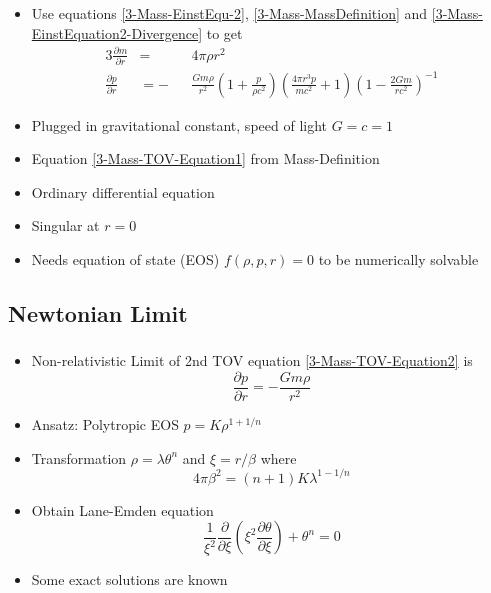 \begin{frame}
	\begin{itemize}[<+->]
		\item Use equations \ref{3-Mass-EinstEqu-2}, \ref{3-Mass-MassDefinition} and \ref{3-Mass-EinstEquation2-Divergence} to get
		\begin{alignat}{3}
			\frac{\partial m}{\partial r} &= &&4\pi\rho r^2\label{3-Mass-TOV-Equation1}\\
			\frac{\partial p}{\partial r} &= -&&\frac{Gm\rho}{r^2}\left(1+\frac{p}{\rho c^2}\right)\left(\frac{4\pi r^3p}{mc^2}+1\right)\left(1-\frac{2Gm}{rc^2}\right)^{-1}\label{3-Mass-TOV-Equation2}
		\end{alignat}
		\item Plugged in gravitational constant, speed of light $G=c=1$
		\item Equation \ref{3-Mass-TOV-Equation1} from Mass-Definition
		\item Ordinary differential equation
		\item Singular at $r=0$
		\item Needs equation of state (EOS) $f(\rho,p,r)=0$ to be numerically solvable
	\end{itemize}
\end{frame}

\subsection{Newtonian Limit}
\begin{frame}
	\frametitle{\insertsubsection}
	\begin{itemize}[<+->]
		\item Non-relativistic Limit of 2nd TOV equation \ref{3-Mass-TOV-Equation2} is
		\begin{equation}\frac{
			\partial p}{\partial r}=-\frac{Gm\rho}{r^2}
		\end{equation}
		\item Ansatz: Polytropic EOS $p=K\rho^{1+1/n}$
		\item Transformation $\rho=\lambda\theta^n$ and $\xi=r/\beta$ where
		\begin{equation}
			4\pi\beta^2=(n+1)K\lambda^{1-1/n}
		\end{equation}
		\item Obtain Lane-Emden equation \cite{laneTheoreticalTemperatureSun1870} \cite{emdenGaskugeln1907}
		\begin{equation}
			\frac{1}{\xi^2}\frac{\partial}{\partial\xi}\left(\xi^2\frac{\partial\theta}{\partial\xi}\right)+\theta^n=0
		\end{equation}
		\item Some exact solutions are known \cite{chandrasekharChandrasekharAnIntroductionStudy1958}
	\end{itemize}
\end{frame}


